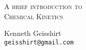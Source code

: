 
\thispagestyle{empty}
\begin{center}
  \normalsize \textsc{A brief introduction to}
  \\ \vspace{2cm}
  \LARGE \textsc{Chemical Kinetics}
\end{center}

\vfill


\begin{center}
  Kenneth Geisshirt\\
  \texttt{geisshirt@gmail.com}
\end{center}
